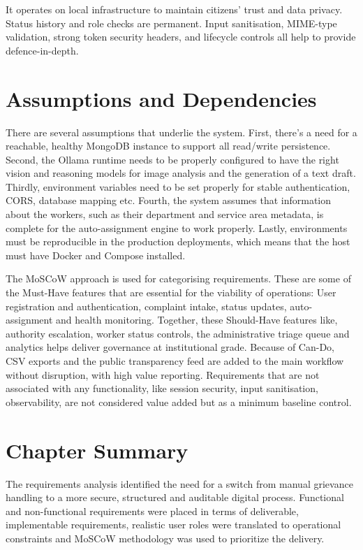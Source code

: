 It operates on local infrastructure to maintain citizens' trust and data privacy. Status history and role checks are permanent. Input sanitisation, MIME-type validation, strong token security headers, and lifecycle controls all help to provide defence-in-depth.

\section{Assumptions and Dependencies}

There are several assumptions that underlie the system. First, there's a need for a reachable, healthy MongoDB instance to support all read/write persistence. Second, the Ollama runtime needs to be properly configured to have the right vision and reasoning models for image analysis and the generation of a text draft. Thirdly, environment variables need to be set properly for stable authentication, CORS, database mapping etc. Fourth, the system assumes that information about the workers, such as their department and service area metadata, is complete for the auto-assignment engine to work properly. Lastly, environments must be reproducible in the production deployments, which means that the host must have Docker and Compose installed.

The MoSCoW approach is used for categorising requirements. These are some of the Must-Have features that are essential for the viability of operations: User registration and authentication, complaint intake, status updates, auto-assignment and health monitoring. Together, these Should-Have features like, authority escalation, worker status controls, the administrative triage queue and analytics helps deliver governance at institutional grade. Because of Can-Do, CSV exports and the public transparency feed are added to the main workflow without disruption, with high value reporting. Requirements that are not associated with any functionality, like session security, input sanitisation, observability, are not considered value added but as a minimum baseline control.

\section{Chapter Summary}

The requirements analysis identified the need for a switch from manual grievance handling to a more secure, structured and auditable digital process. Functional and non-functional requirements were placed in terms of deliverable, implementable requirements, realistic user roles were translated to operational constraints and MoSCoW methodology was used to prioritize the delivery.

